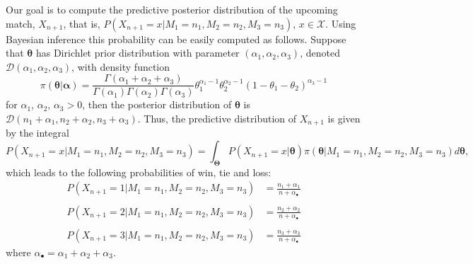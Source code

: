 \documentclass[journal,article,accept,moreauthors,pdftex,12pt,a4paper]{mdpi}
\begin{document}
        Our goal is to compute the predictive posterior distribution of the
        upcoming match, $X_{n+1}$, that is,
        $P(X_{n+1}=x|M_1=n_1,M_2=n_2,M_3=n_3)$, $x\in\mathcal{X}$. Using
        Bayesian inference this probability can be easily computed as
        follows. Suppose that $\boldsymbol{\theta}$ has Dirichlet prior distribution
        with parameter $(\alpha_1,\alpha_2,\alpha_3)$, denoted
        $\mathcal{D}(\alpha_1,\alpha_2,\alpha_3)$, with density function
        \[
        \pi(\boldsymbol{\theta}|\boldsymbol{\alpha})=\frac{\Gamma(\alpha_1+\alpha_2+\alpha_3)}{\Gamma(\alpha_1)\Gamma(\alpha_2)\Gamma(\alpha_3)}\theta_1^{\alpha_1-1}\theta_2^{\alpha_2-1}(1-\theta_1-\theta_2)^{\alpha_3-1}
        \]
        \noindent for $\alpha_1$, $\alpha_2$, $\alpha_3 > 0$, then the
        posterior distribution of $\boldsymbol{\theta}$ is
        $\mathcal{D}(n_1+\alpha_1,n_2+\alpha_2,n_3+\alpha_3)$. Thus, the
        predictive distribution of $X_{n + 1}$ is given by the
        integral
        $$
        P(X_{n + 1} = x | M_1 = n_1, M_2 = n_2, M_3 = n_3) = \int_{\boldsymbol{\Theta}} P(X_{n
            + 1} = x | \boldsymbol{\theta}) \pi(\boldsymbol{\theta} | M_1 = n_1, M_2 = n_2, M_3
        = n_3) d\boldsymbol{\theta},
        $$
        which leads to the following probabilities of win, tie and loss:
        \begin{align*}
            P(X_{n+1} = 1 | M_1=n_1,M_2=n_2,M_3=n_3) &=
            \frac{n_1+\alpha_1}{n+\alpha_{\bullet}}\\
            & \\
            P(X_{n+1} = 2 | M_1=n_1,M_2=n_2,M_3=n_3) &=
            \frac{n_2+\alpha_2}{n+\alpha_{\bullet}} \\
            & \\
            P(X_{n+1} = 3 | M_1=n_1, M_2=n_2, M_3=n_3) &=
            \frac{n_3+\alpha_3}{n+\alpha_{\bullet}}
        \end{align*}
        \noindent where $\alpha_{\bullet} =\alpha_1+\alpha_2+\alpha_3$.
\end{document}
